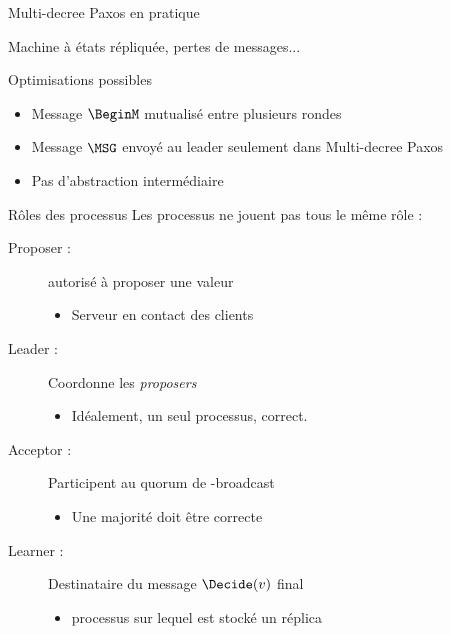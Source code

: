 
\begingroup


\begin{frame}{Multi-decree Paxos en pratique}

  Machine à états répliquée, pertes de messages...

  \begin{block}{Optimisations possibles}
    \begin{itemize}
    \item Message $\BeginM$ mutualisé entre plusieurs rondes
    \item Message $\MSG$ envoyé au leader seulement dans Multi-decree Paxos
    \item Pas d'abstraction intermédiaire
    \end{itemize}
  \end{block}

  \begin{block}{Rôles des processus}
    Les processus ne jouent pas tous le même rôle :
    \begin{description}
    \item[Proposer :] autorisé à proposer une valeur
      \begin{itemize}
      \item \vspace{-1mm} Serveur en contact des clients
      \end{itemize}
    \item[Leader :] Coordonne les \emph{proposers}
      \begin{itemize}
      \item \vspace{-1mm} Idéalement, un seul processus, correct. 
      \end{itemize}
    \item[Acceptor :] Participent au quorum de \MB-broadcast
      \begin{itemize}
      \item \vspace{-1mm} Une majorité doit être correcte
      \end{itemize}
    \item[Learner :] Destinataire du message $\Decide(v)$ final
      \begin{itemize}
      \item \vspace{-1mm} processus sur lequel est stocké un réplica
      \end{itemize}
    \end{description}
  \end{block}

\end{frame}

\endgroup
\endinput
